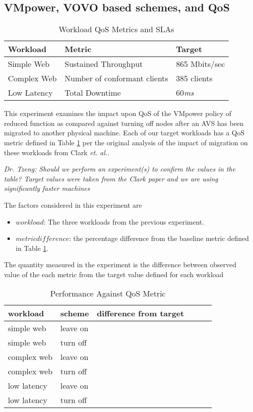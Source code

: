 \documentclass[times, 10pt,twocolumn]{article}
\begin{document}
\subsection{VMpower, VOVO based schemes, and QoS}
\label{sec:qos}
\begin{table}
  \centering
  \begin{tabular}{l|l|l}
    Workload&Metric&Target\\
    \hline
    Simple Web&Sustained Throughput&865 Mbits/sec\\
    Complex Web&Number of conformant clients&385 clients\\
    Low Latency&Total Downtime&60\textit{ms}\\
  \end{tabular}
  \caption{Workload QoS Metrics and SLAs}
  \label{tab:qosmetrics}
\end{table}
This experiment examines the impact upon QoS of the VMpower policy of reduced
function as compared against turning off nodes after an AVS has been migrated
to another physical machine.    Each of our target workloads has a QoS metric
defined in Table \ref{tab:qosmetrics} per the original analysis of the impact
of migration on these workloads from Clark \textit{et. al.}\cite{Clark2005}.

\emph{Dr. Tzeng: Should we perform an experiment(s) to confirm the values in
  the table?  Target values were taken from the Clark paper and we are using
  significantly faster machines}

The factors considered in this experiment are
\begin{itemize}
\item $workload$: The three workloads from the previous experiment.
\item $metric difference$: the percentage difference from the baseline metric
  defined in Table \ref{tab:qosmetrics}.
\end{itemize}

The quantity measured in the experiment is the difference between observed
value of the each metric from the target value defined for each workload

\begin{table}
  \centering
  \begin{tabular}{l|l|l|lll}
    workload&scheme&difference from target&&\\
    \hline
    simple web&leave on& & & \\
    simple web&turn off& & & \\
    complex web&leave on& & & \\
    complex web&turn off& & & \\
    low latency&leave on& & & \\
    low latency&turn off& & & \\
  \end{tabular}
  \caption{Performance Against QoS Metric}
  \label{tab:exp2}
\end{table}
\end{document}
